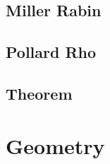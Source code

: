 \documentclass[a4paper,10pt,twocolumn,oneside]{article}
\begin{document}
%

%

\subsection{Miller Rabin}


\subsection{Pollard Rho}


%

%

%

\subsection{Theorem}


%


\section{Geometry}
\end{document}
